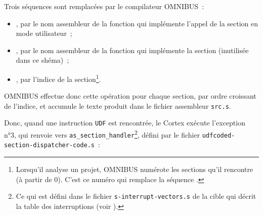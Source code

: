 Trois séquences sont remplacées par le compilateur OMNIBUS~:
\begin{itemize}
\item {}, par le nom assembleur de la fonction qui implémente l'appel de la section en mode utilisateur~;
\item {}, par le nom assembleur de la fonction qui implémente la section (inutilisée dans ce shéma)~;
\item {}, par l'indice de la section\footnote{Lorsqu'il analyse un projet, OMNIBUS numérote les sections qu'il rencontre (à partir de $0$). C'est ce numéro qui remplace la séquence .}.
\end{itemize}

OMNIBUS effectue donc cette opération pour chaque section, par ordre croissant de l'indice, et accumule le texte produit dans le fichier assembleur \texttt{src.s}.

Donc, quand une instruction \texttt{UDF} est rencontrée, le Cortex exécute l'exception n°3, qui renvoie vers \texttt{as\_section\_handler}\footnote{Ce qui est défini dans le fichier \texttt{s-interrupt-vectors.s} de la cible qui décrit la table des interruptions (voir ).}, défini par le fichier \texttt{udfcoded-section-dispatcher-code.s}~:

